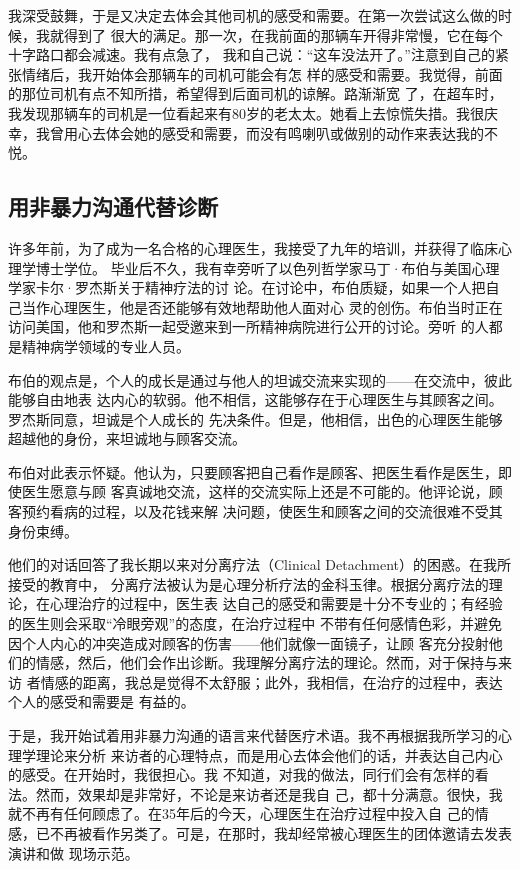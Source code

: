 \documentclass{ctexart}
\begin{document}
我深受鼓舞，于是又决定去体会其他司机的感受和需要。在第一次尝试这么做的时候，我就得到了
很大的满足。那一次，在我前面的那辆车开得非常慢，它在每个十字路口都会减速。我有点急了，
我和自己说：``这车没法开了。''注意到自己的紧张情绪后，我开始体会那辆车的司机可能会有怎
样的感受和需要。我觉得，前面的那位司机有点不知所措，希望得到后面司机的谅解。路渐渐宽
了，在超车时，我发现那辆车的司机是一位看起来有80岁的老太太。她看上去惊慌失措。我很庆
幸，我曾用心去体会她的感受和需要，而没有鸣喇叭或做别的动作来表达我的不悦。


\subsection{用非暴力沟通代替诊断}

许多年前，为了成为一名合格的心理医生，我接受了九年的培训，并获得了临床心理学博士学位。
毕业后不久，我有幸旁听了以色列哲学家马丁·布伯与美国心理学家卡尔·罗杰斯关于精神疗法的讨
论。在讨论中，布伯质疑，如果一个人把自己当作心理医生，他是否还能够有效地帮助他人面对心
灵的创伤。布伯当时正在访问美国，他和罗杰斯一起受邀来到一所精神病院进行公开的讨论。旁听
的人都是精神病学领域的专业人员。

布伯的观点是，个人的成长是通过与他人的坦诚交流来实现的------在交流中，彼此能够自由地表
达内心的软弱。他不相信，这能够存在于心理医生与其顾客之间。罗杰斯同意，坦诚是个人成长的
先决条件。但是，他相信，出色的心理医生能够超越他的身份，来坦诚地与顾客交流。

布伯对此表示怀疑。他认为，只要顾客把自己看作是顾客、把医生看作是医生，即使医生愿意与顾
客真诚地交流，这样的交流实际上还是不可能的。他评论说，顾客预约看病的过程，以及花钱来解
决问题，使医生和顾客之间的交流很难不受其身份束缚。

他们的对话回答了我长期以来对分离疗法（Clinical Detachment）的困惑。在我所接受的教育中，
分离疗法被认为是心理分析疗法的金科玉律。根据分离疗法的理论，在心理治疗的过程中，医生表
达自己的感受和需要是十分不专业的；有经验的医生则会采取``冷眼旁观''的态度，在治疗过程中
不带有任何感情色彩，并避免因个人内心的冲突造成对顾客的伤害------他们就像一面镜子，让顾
客充分投射他们的情感，然后，他们会作出诊断。我理解分离疗法的理论。然而，对于保持与来访
者情感的距离，我总是觉得不太舒服；此外，我相信，在治疗的过程中，表达个人的感受和需要是
有益的。

于是，我开始试着用非暴力沟通的语言来代替医疗术语。我不再根据我所学习的心理学理论来分析
来访者的心理特点，而是用心去体会他们的话，并表达自己内心的感受。在开始时，我很担心。我
不知道，对我的做法，同行们会有怎样的看法。然而，效果却是非常好，不论是来访者还是我自
己，都十分满意。很快，我就不再有任何顾虑了。在35年后的今天，心理医生在治疗过程中投入自
己的情感，已不再被看作另类了。可是，在那时，我却经常被心理医生的团体邀请去发表演讲和做
现场示范。
\end{document}
